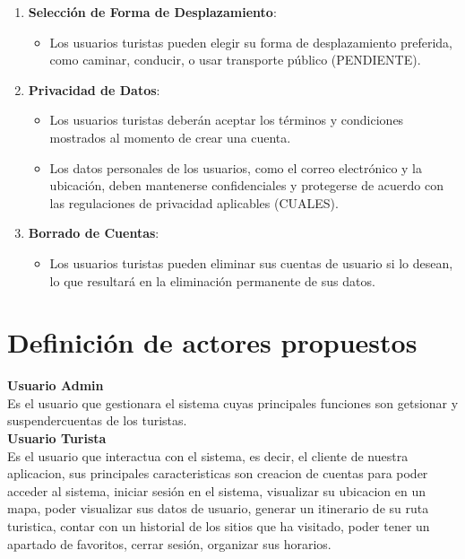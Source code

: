 \documentclass{article}
\begin{document}
\begin{enumerate}
    \item \textbf{Selección de Forma de Desplazamiento}:
    \begin{itemize}
        \item Los usuarios turistas pueden elegir su forma de desplazamiento preferida, como caminar, conducir, o usar transporte público (PENDIENTE).
    \end{itemize}
    
    \item \textbf{Privacidad de Datos}:
    \begin{itemize}
        \item Los usuarios turistas deberán aceptar los términos y condiciones mostrados al momento de crear una cuenta.
        \item Los datos personales de los usuarios, como el correo electrónico y la ubicación, deben mantenerse confidenciales y protegerse de acuerdo con las regulaciones de privacidad aplicables (CUALES).
    \end{itemize}
    
    \item \textbf{Borrado de Cuentas}:
    \begin{itemize}
        \item Los usuarios turistas pueden eliminar sus cuentas de usuario si lo desean, lo que resultará en la eliminación permanente de sus datos.
    \end{itemize}
\end{enumerate}


    
\section{\textcolor{azul}{Definición de actores propuestos}}
\textbf{Usuario Admin}\\
Es el usuario que gestionara  el sistema cuyas principales funciones son getsionar y suspendercuentas de los turistas.\\
\vspace{.5cm}
\textbf{Usuario Turista}\\
Es el usuario que interactua con el sistema, es decir, el cliente de nuestra aplicacion, sus principales caracteristicas son creacion de cuentas para poder acceder al sistema, iniciar sesión en el sistema, visualizar su ubicacion en un mapa, poder visualizar sus datos de usuario, generar un itinerario de su ruta turistica, contar con un historial de los sitios que ha visitado, poder tener un apartado de favoritos, cerrar sesión, organizar sus horarios. 
\end{document}
